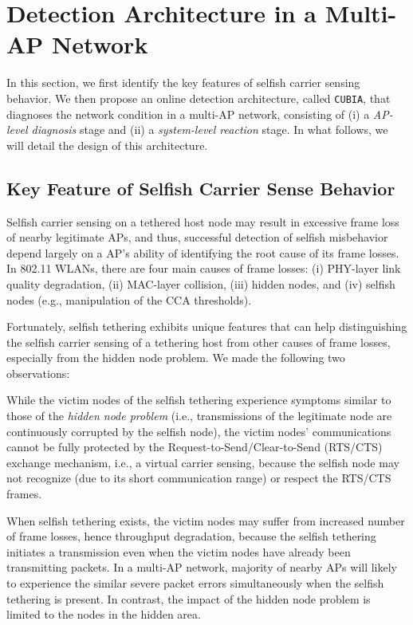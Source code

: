 \section{Detection Architecture in a Multi-AP Network}

In this section, we first identify the key features of selfish
carrier sensing behavior. We then propose an online detection
architecture, called {\tt CUBIA}, that diagnoses the network
condition in a multi-AP network, consisting of (i) a \emph{AP-level
diagnosis} stage and (ii) a \emph{system-level reaction} stage.
%
In what follows, we will detail the design of this architecture.


\subsection{Key Feature of Selfish Carrier Sense Behavior}

Selfish carrier sensing on a tethered host node may result in
excessive frame loss of nearby legitimate APs, and thus, successful
detection of selfish misbehavior depend largely on a AP's ability
of identifying the root cause of its frame losses.
%
In 802.11 WLANs, there are four main causes of frame losses:
(i) PHY-layer link quality degradation, (ii) MAC-layer collision,
(iii) hidden nodes, and (iv) selfish nodes (e.g., manipulation
of the CCA thresholds).

Fortunately, selfish tethering exhibits unique features that
can help distinguishing the selfish carrier sensing of a
tethering host from other causes of frame losses, especially
from the hidden node problem.
%
We made the following two observations:

\myitemizebegin
%
\item[{\bf O1)}]
While the victim nodes of the selfish tethering experience
symptoms similar to those of the \emph{hidden node problem}
(i.e., transmissions of the legitimate node are continuously
corrupted by the selfish node), the victim nodes' communications
cannot be fully protected by the Request-to-Send/Clear-to-Send
(RTS/CTS) exchange mechanism, i.e., a virtual carrier sensing,
because the selfish node may not recognize (due to its short
communication range) or respect the RTS/CTS frames.
%
%
\item[{\bf O2)}]
When selfish tethering exists, the victim nodes may suffer from
increased number of frame losses, hence throughput degradation,
because the selfish tethering initiates a transmission even when
the victim nodes have already been transmitting packets.
%
In a multi-AP network, majority of nearby APs will likely to
experience the similar severe packet errors simultaneously when
the selfish tethering is present. In contrast, the impact of the
hidden node problem is limited to the nodes in the hidden area.
%
\myitemizeend


